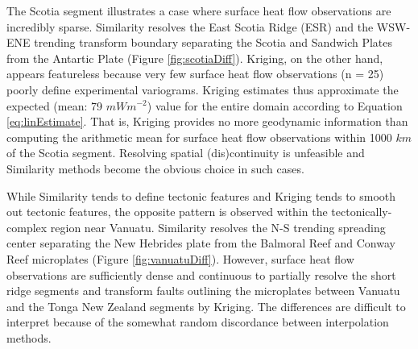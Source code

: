 The Scotia segment illustrates a case where surface heat flow observations are incredibly sparse. Similarity resolves the East Scotia Ridge (ESR) and the WSW-ENE trending transform boundary separating the Scotia and Sandwich Plates from the Antartic Plate (Figure \ref{fig:scotiaDiff}). Kriging, on the other hand, appears featureless because very few surface heat flow observations (n = 25) poorly define experimental variograms. Kriging estimates thus approximate the expected (mean: 79 \(mWm^{-2}\)) value for the entire domain according to Equation \eqref{eq:linEstimate}. That is, Kriging provides no more geodynamic information than computing the arithmetic mean for surface heat flow observations within 1000 \(km\) of the Scotia segment. Resolving spatial (dis)continuity is unfeasible and Similarity methods become the obvious choice in such cases.

While Similarity tends to define tectonic features and Kriging tends to smooth out tectonic features, the opposite pattern is observed within the tectonically-complex region near Vanuatu. Similarity resolves the N-S trending spreading center separating the New Hebrides plate from the Balmoral Reef and Conway Reef microplates (Figure \ref{fig:vanuatuDiff}). However, surface heat flow observations are sufficiently dense and continuous to partially resolve the short ridge segments and transform faults outlining the microplates between Vanuatu and the Tonga New Zealand segments by Kriging. The differences are difficult to interpret because of the somewhat random discordance between interpolation methods.



